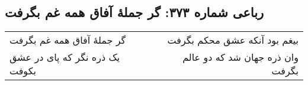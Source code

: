 \begin{center}
\section*{رباعی شماره ۳۷۳: گر جملهٔ آفاق همه غم بگرفت}
\label{sec:0373}
\begin{longtable}{l p{0.5cm} r}
گر جملهٔ آفاق همه غم بگرفت
&&
بیغم بود آنکه عشق محکم بگرفت
\\
یک ذره نگر که پای در عشق بکوفت
&&
وان ذره جهان شد که دو عالم بگرفت
\\
\end{longtable}
\end{center}
